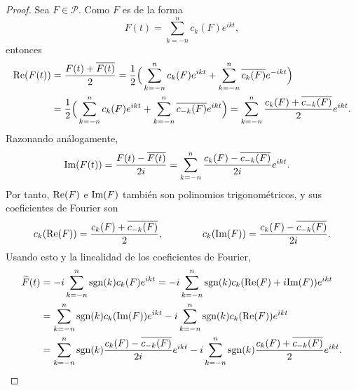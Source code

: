\documentclass[a4paper, 12pt]{book}
\begin{document}
\begin{proof}
    Sea $F \in \mathcal{P}$. Como $F$ es de la forma
    \[F(t) = \sum_{k=-n}^n c_k(F)e^{ikt},\]
    entonces
    \begin{align*}
        \textup{Re}(F(t)) &= \frac{F(t)+\overline{F(t)}}{2} = \frac{1}{2}\Bigl(\,\sum_{k=-n}^n c_k(F)e^{ikt}+\sum_{k=-n}^n\overline{c_k(F)}e^{-ikt}\Bigr) \\
        &= \frac{1}{2}\Bigl(\,\sum_{k=-n}^n c_k(F)e^{ikt}+\sum_{k=-n}^n\overline{c_{-k}(F)}e^{ikt}\Bigr) = \sum_{k=-n}^n \frac{c_k(F)+\overline{c_{-k}(F)}}{2}e^{ikt}.
    \end{align*}
    Razonando análogamente,
    \begin{align*}
        \textup{Im}(F(t)) &= \frac{F(t)-\overline{F(t)}}{2i} = \sum_{k=-n}^n \frac{c_k(F)-\overline{c_{-k}(F)}}{2i}e^{ikt}.
    \end{align*}
    Por tanto, $\textup{Re}(F)$ e $\textup{Im}(F)$ también son polinomios trigonométricos, y sus coeficientes de Fourier son
    \[c_k(\textup{Re}(F)) = \frac{c_k(F)+\overline{c_{-k}(F)}}{2}, \qquad \qquad c_k(\textup{Im}(F)) = \frac{c_k(F)-\overline{c_{-k}(F)}}{2i}.\]
    Usando esto y la linealidad de los coeficientes de Fourier,
    \begin{equation}\label{3.3.2}
    \begin{aligned}[b]
        \widetilde{F}(t) &= -i\sum_{k=-n}^n \textup{sgn}(k)c_k(F)e^{ikt} = -i\sum_{k=-n}^n \textup{sgn}(k)c_k(\textup{Re}(F)+i\textup{Im}(F))e^{ikt} \\
        &= \sum_{k=-n}^n \textup{sgn}(k)c_k(\textup{Im}(F))e^{ikt} -i\sum_{k=-n}^n \textup{sgn}(k)c_k(\textup{Re}(F))e^{ikt} \\
        &=  \sum_{k=-n}^n \textup{sgn}(k)\frac{c_k(F)-\overline{c_{-k}(F)}}{2i}e^{ikt} -i\sum_{k=-n}^n \textup{sgn}(k)\frac{c_k(F)+\overline{c_{-k}(F)}}{2}e^{ikt}.
     \end{aligned}
    \end{equation}
    

\end{proof}
\end{document}
